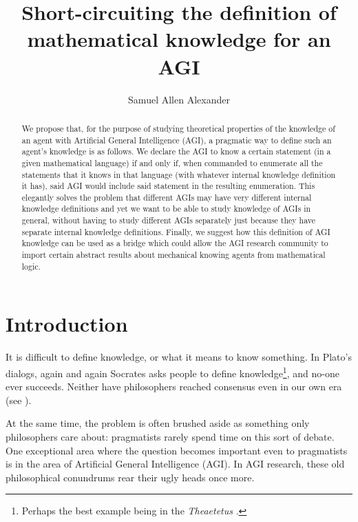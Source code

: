 \documentclass[runningheads]{llncs}
\begin{document}
\title{Short-circuiting the definition of mathematical knowledge for an AGI
}


\author{Samuel Allen
Alexander}



\maketitle

\begin{abstract}
We propose that, for the purpose of studying theoretical properties of
the knowledge of an agent with Artificial General Intelligence (AGI),
a pragmatic way to define such an agent's knowledge is as follows.
We declare the AGI to know a certain statement
(in a given mathematical language) if and only if, when commanded
to enumerate all the statements that it knows in that language
(with whatever internal knowledge definition it has), said AGI
would include said statement in the resulting enumeration.
This elegantly solves the problem that different AGIs may have
very different internal knowledge definitions and yet we want
to be able to study knowledge of AGIs in general, without having
to study different AGIs separately just because they have separate
internal knowledge definitions. Finally, we suggest how this
definition of AGI knowledge can be used as a bridge which could
allow the AGI research community to import certain abstract results
about mechanical knowing agents from mathematical logic.
\end{abstract}

\section{Introduction}

It is difficult to define knowledge, or what it means to know something.
In Plato's dialogs, again and again Socrates asks people to define
knowledge\footnote{Perhaps the best example being in the \emph{Theaetetus}
\cite{theaetetus}.}, and no-one ever succeeds. Neither have philosophers
reached consensus even in our own era (see \cite{sep-knowledge-analysis}).

At the same time, the problem is often brushed aside as something only
philosophers care about: pragmatists rarely spend time
on this sort of debate. One exceptional area where the question becomes
important even to pragmatists is in the area of Artificial General Intelligence
(AGI). In AGI research, these old philosophical conundrums rear their ugly heads
once more.
\end{document}
